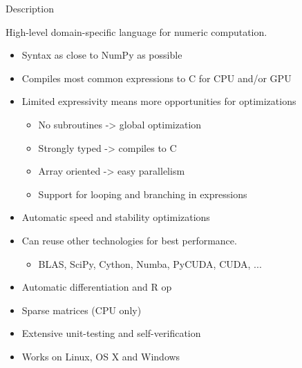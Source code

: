 \documentclass[utf8x,xcolor=pdftex,dvipsnames,table]{beamer}
\begin{document}
\begin{frame}{Description}

  High-level domain-specific language for numeric computation.

  \begin{itemize}
    \item Syntax as close to NumPy as possible
    \item Compiles most common expressions to C for CPU and/or GPU
    \item Limited expressivity means more opportunities for optimizations
    \begin{itemize}
      \item No subroutines -> global optimization
      \item Strongly typed -> compiles to C
      \item Array oriented -> easy parallelism
      \item Support for looping and branching in expressions
    \end{itemize}
    \item Automatic speed and stability optimizations
    \item Can reuse other technologies for best performance.
    \begin{itemize}
      \item BLAS, SciPy, Cython, Numba, PyCUDA, CUDA, ...
    \end{itemize}
    \item Automatic differentiation and R op
    \item Sparse matrices (CPU only)
    \item Extensive unit-testing and self-verification
    \item Works on Linux, OS X and Windows
  \end{itemize}
\end{frame}





\end{document}
